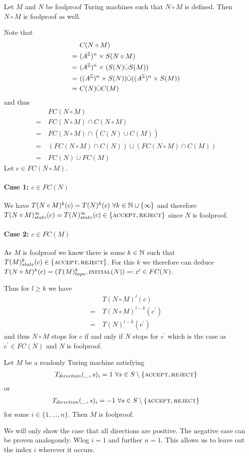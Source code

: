\begin{Lemma}
	Let $M$ and $N$ be foolproof Turing machines such that $N \circ M$ is defined. Then $N \circ M$ is foolproof as well.
\end{Lemma}
\proof
Note that
\begin{align*}
	&C(N \circ M) \\
	=~&(A^{\mathbb{Z}})^n \times S(N \circ M) \\
	=~&(A^{\mathbb{Z}})^n \times (S(N) \dot\cup S(M)) \\
	=~&((A^{\mathbb{Z}})^n \times S(N)) \dot\cup ((A^{\mathbb{Z}})^n \times S(M)) \\
	=~&C(N) \dot\cup C(M)
\end{align*}
and thus
\begin{align*}
	&FC(N \circ M) \\
	=~&FC(N \circ M) \cap C(N \circ M) \\
	=~&FC(N \circ M) \cap (C(N) \dot\cup C(M)) \\
	=~&(FC(N \circ M) \cap C(N)) \dot\cup (FC(N \circ M) \cap C(M)) \\
	=~&FC(N) \dot\cup FC(M)
\end{align*}
Let $c \in FC(N \circ M)$.
\paragraph{Case 1: $c \in FC(N)$}
We have
$T(N \circ M)^k (c) = T(N)^k (c) ~\forall k \in \mathbb{N} \cup \{\infty\}$
and therefore $T(N \circ M)_{state}^\infty(c) = T(N)_{state}^\infty(c) \in \{\text{\scshape{accept}},\text{\scshape{reject}}\}$
since $N$ is foolproof.
\paragraph{Case 2: $c \in FC(M)$}
As $M$ is foolproof we know there is some $k \in \mathbb{N}$ such that $T(M)_{state}^k(c) \in \{\text{\scshape{accept}},\text{\scshape{reject}}\}$.
For this $k$ we therefore can deduce
$T(N \circ M)^k(c) = (T(M)_{tape}^k,\text{\scshape{initial}}(N)) =: c^\prime \in FC(N)$.

Thus for $l \geq k$ we have
\begin{align*}
	&T(N \circ M)^l(c) \\
	=~&T(N \circ M)^{l-k}(c^\prime) \\
	=~&T(N)^{l-k}(c^\prime)
\end{align*}
and thus $N \circ M$ stops for $c$ if and only if $N$ stops for $c^\prime$ which is the case as $c^\prime \in FC(N)$ and $N$ is foolproof.
\endproof

\begin{Lemma}
	Let $M$ be a readonly Turing machine satisfying
	\begin{align*}
		T_{direction} (\_,s)_i = 1~\forall s \in S \setminus \{\text{\scshape{accept}},\text{\scshape{reject}}\}
	\end{align*}
	or
	\begin{align*}
		T_{direction} (\_,s)_i = -1~\forall s \in S \setminus \{\text{\scshape{accept}},\text{\scshape{reject}}\}
	\end{align*}
	for some $i \in \{1,...,n\}$.
	Then $M$ is foolproof.
\end{Lemma}
\proof
We will only show the case that all directions are positive. The negative case can be proven analogously.
Wlog $i=1$ and further $n=1$. This allows us to leave out the index $i$ wherever it occurs.

